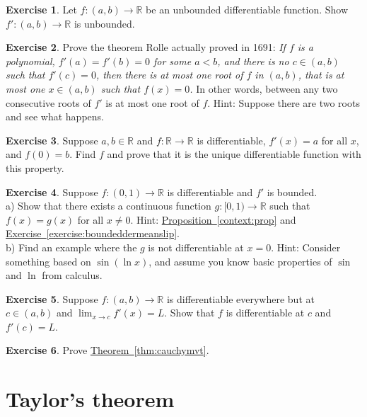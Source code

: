 \documentclass[12pt]{book}
\newcommand{\R}{{\mathbb{R}}}
\newcommand{\sectionnewpage}{\clearpage}
\theoremstyle{plain}
\theoremstyle{remark}
\theoremstyle{definition}
\theoremstyle{exercise}
\newtheorem{exercise}{Exercise}[section]
\theoremstyle{example}
\newcommand{\exerciseref}[1]{\hyperref[#1]{Exercise~\ref*{#1}}}
\newcommand{\thmref}[1]{\hyperref[#1]{Theorem~\ref*{#1}}}
\newcommand{\propref}[1]{\hyperref[#1]{Proposition~\ref*{#1}}}
\begin{document}
\begin{exercise}
Let $f \colon (a,b) \to \R$ be an unbounded differentiable function.  Show
$f' \colon (a,b) \to \R$ is unbounded.
\end{exercise}

\begin{exercise}
Prove the theorem Rolle actually proved in 1691:
\emph{If $f$ is a polynomial,
$f'(a) = f'(b) = 0$ for some $a < b$,
and there is no $c \in (a,b)$ such that $f'(c) = 0$,
then there is at most one root of $f$ in $(a,b)$,
that is at most one $x \in (a,b)$ such that $f(x) = 0$.}
In other words, between any two consecutive roots of $f'$ is at most one
root of $f$.
Hint: Suppose there are two roots and see what happens.
\end{exercise}

\begin{exercise}
Suppose $a,b \in \R$ and $f \colon \R \to \R$ is differentiable,
$f'(x) = a$ for all $x$, and $f(0) = b$.  Find $f$ and prove that 
it is the unique differentiable function with this property.
\end{exercise}

\begin{exercise} \label{exercise:extendboundedder}
Suppose $f \colon (0,1) \to \R$ is differentiable and $f'$
is bounded.\\
a) Show that there exists a continuous function $g \colon [0,1) \to \R$
such that $f(x) = g(x)$ for all $x \not= 0$.  Hint: \propref{context:prop} and
\exerciseref{exercise:boundeddermeanslip}.
\\
b) Find an example where the $g$ is not differentiable at $x=0$.
Hint: Consider something based on $\sin(\ln x)$,
and assume you know basic properties of
$\sin$ and $\ln$ from calculus.
\end{exercise}

\begin{exercise}
Suppose $f \colon (a,b) \to \R$ is differentiable everywhere but at $c \in
(a,b)$ and $\lim_{x \to c} f'(x) = L$.  Show that $f$ is differentiable at
$c$ and $f'(c) = L$.
\end{exercise}

\begin{exercise}
Prove \thmref{thm:cauchymvt}.
\end{exercise}


\sectionnewpage
\section{Taylor's theorem}
\label{sec:taylor}
\end{document}
